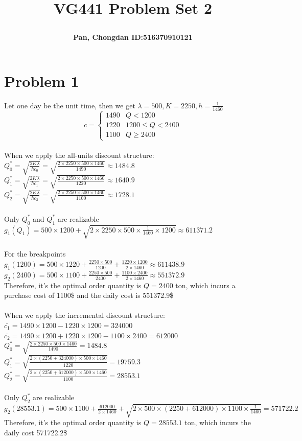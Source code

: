 \documentclass[a4paper]{article}
\title{\Large \textbf{VG441 Problem Set 2}\\
\author{\textbf{Pan, Chongdan ID:516370910121}\\
}
}
\begin{document}
\maketitle
\section{Problem 1}
\quad
Let one day be the unit time, then we get $\lambda=500,K=2250,h=\frac{1}{1460}$
\\\[c=\begin{cases}
    1490 & Q<1200\\
    1220 & 1200\leq Q<2400\\
    1100 & Q\geq 2400
\end{cases}\]
\\When we apply the all-units discount structure:
\\$Q_0^*=\sqrt{\frac{2K\lambda}{hc_0}}=\sqrt{\frac{2\times2250\times500\times1460}{1490}}\approx1484.8$
\\$Q_1^*=\sqrt{\frac{2K\lambda}{hc_1}}=\sqrt{\frac{2\times2250\times500\times1460}{1220}}\approx1640.9$
\\$Q_2^*=\sqrt{\frac{2K\lambda}{hc_2}}=\sqrt{\frac{2\times2250\times500\times1460}{1100}}\approx1728.1$
\\\\Only $Q_0^*$ and $Q_1^*$ are realizable
\\$g_1(Q_1)=500\times1200+\sqrt{2\times2250\times500\times\frac{1}{1460}\times1200}\approx611371.2$
\\\\For the breakpoints
\\$g_1(1200)=500\times1220+\frac{2250\times500}{1200}+\frac{1220\times1200}{2\times1460}\approx611438.9$
\\$g_2(2400)=500\times1100+\frac{2250\times500}{2400}+\frac{1100\times2400}{2\times1460}\approx551372.9$
\\Therefore, it's the optimal order quantity is $Q=2400$ ton, which incurs a purchase cost of 1100\$ and the daily cost is 551372.9\$
\\\\When we apply the incremental discount structure:
\\$\bar{c_1}=1490\times1200-1220\times1200=324000$
\\$\bar{c_2}=1490\times1200+1220\times1200-1100\times2400=612000$
\\$Q_0^*=\sqrt{\frac{2\times2250\times500\times1460}{1490}}=1484.8$
\\$Q_1^*=\sqrt{\frac{2\times(2250+324000)\times500\times1460}{1220}}=19759.3$
\\$Q_2^*=\sqrt{\frac{2\times(2250+612000)\times500\times1460}{1100}}=28553.1$
\\\\Only $Q_2^*$ are realizable
\\$g_2(28553.1)=500\times1100+\frac{612000}{2\times1460}+\sqrt{2\times500\times(2250+612000)\times1100\times\frac{1}{1460}}=571722.2$
\\Therefore, it's the optimal order quantity is $Q=28553.1$ ton, which incurs the daily cost 571722.2\$
\end{document}
